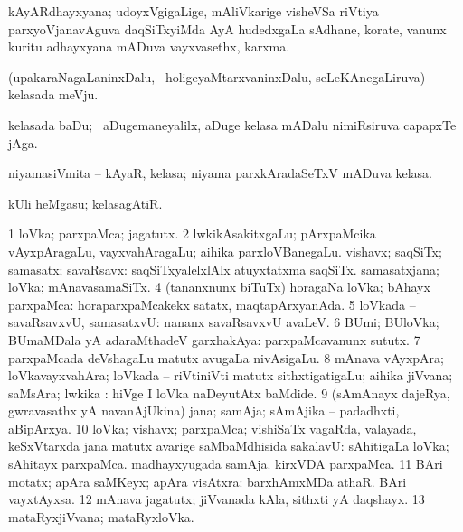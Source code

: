 \bentry
{} 
\gl{\nA}
\expl{}
\bmng
kAyARdhayxyana; udoyxVgigaLige, mAliVkarige visheVSa riVtiya parxyoVjanavAguva daqSiTxyiMda AyA hudedxgaLa sAdhane, korate, \mo vanunx kuritu adhayxyana mADuva vayxvasethx, karxma. 
\emng
\eentry

\bentry
{} 
\gl{\nA}
\expl{}
\bmng
(upakaraNagaLaninxDalu, \kanmu\ holigeyaMtarxvaninxDalu, seLeKAnegaLiruva) kelasada meVju. 
\emng
\eentry

\bentry
{} 
\gl{\nA}
\expl{}
\bmng
kelasada baDu; \kanmu\ aDugemaneyalilx, aDuge kelasa mADalu nimiRsiruva capapxTe jAga. 
\emng
\eentry

\bentry
{} 
\gl{\nA}
\expl{}
\bmng
niyamasiVmita -- kAyaR, kelasa; niyama parxkAradaSeTxV mADuva kelasa. 
\emng
\eentry

\bentry
{} 
\gl{\nA}
\bmng
kUli heMgasu; kelasagAtiR. 
\emng
\eentry

\bentry
{} 
\gl{\nA}
\expl{}
\bmng
% 
\bnum
\num{1} loVka; parxpaMca; jagatutx. 
\num{2} lwkikAsakitxgaLu; pArxpaMcika vAyxpAragaLu, vayxvahAragaLu; aihika parxloVBanegaLu. 
\banum
{} vishavx; saqSiTx; samasatx; savaRsavx:  saqSiTxyalelxlAlx atuyxtatxma saqSiTx. 
 samasatxjana; loVka; mAnavasamaSiTx. 
\eanum
\numie
\num{4} (tananxnunx biTuTx) horagaNa loVka; bAhayx parxpaMca:  horaparxpaMcakekx satatx, maqtapArxyanAda. 
\num{5} loVkada -- savaRsavxvU, samasatxvU:  nananx savaRsavxvU avaLeV. 
\num{6} BUmi; BUloVka; BUmaMDala yA adaraMthadeV garxhakAya:  parxpaMcavanunx sututx. 
\num{7} parxpaMcada deVshagaLu matutx avugaLa nivAsigaLu. 
\num{8} mAnava vAyxpAra; loVkavayxvahAra; loVkada -- riVtiniVti matutx sithxtigatigaLu; aihika jiVvana; saMsAra; lwkika :  hiVge I loVka naDeyutAtx baMdide. 
\num{9} (sAmAnayx dajeRya, gwravasathx yA navanAjUkina) jana; samAja; sAmAjika -- padadhxti, aBipArxya. 
\num{10} loVka; vishavx; parxpaMca; vishiSaTx vagaRda, valayada, keSxVtarxda jana matutx avarige saMbaMdhisida sakalavU:    sAhitigaLa loVka; sAhitayx parxpaMca.  madhayxyugada samAja.  kirxVDA parxpaMca. 
\num{11} BAri motatx; apAra saMKeyx; apAra visAtxra:  barxhAmxMDa athaR.  BAri vayxtAyxsa. 
\num{12} mAnava jagatutx; jiVvanada kAla, sithxti yA daqshayx. 
\num{13} mataRyxjiVvana; mataRyxloVka. 
\enum
\emng

